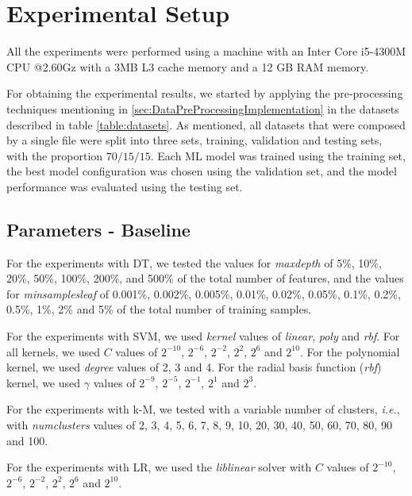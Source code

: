 \section{Experimental Setup}
\label{sec:ExperimentalSetup}

All the experiments were performed using a machine with an Inter Core i5-4300M CPU @2.60Gz with a 3MB L3 cache memory and a 12 GB RAM memory.

For obtaining the experimental results, we started by applying the pre-processing techniques mentioning in \ref{sec:DataPreProcessingImplementation} in the datasets described in table \ref{table:datasets}. As mentioned, all datasets that were composed by a single file were split into three sets, training, validation and testing sets, with the proportion $70/15/15$. Each \ac{ML} model was trained using the training set, the best model configuration was chosen using the validation set, and the model performance was evaluated using the testing set.

\subsection{Parameters - Baseline}

For the experiments with \ac{DT}, we tested the values for \textit{max\textunderscore depth} of 5\%, 10\%, 20\%, 50\%, 100\%, 200\%, and 500\% of the total number of features, and the values for \textit{min\textunderscore samples\textunderscore leaf} of 0.001\%, 0.002\%, 0.005\%, 0.01\%, 0.02\%, 0.05\%, 0.1\%, 0.2\%, 0.5\%, 1\%, 2\% and 5\% of the total number of training samples.

For the experiments with \ac{SVM}, we used \textit{kernel} values of \textit{linear}, \textit{poly} and \textit{rbf}. For all kernels, we used $C$ values of $2^{-10}$, $2^{-6}$, $2^{-2}$, $2^{2}$, $2^{6}$ and $2^{10}$. For the polynomial kernel, we used \textit{degree} values of 2, 3 and 4. For the radial basis function (\textit{rbf}) kernel, we used $\gamma$ values of $2^{-9}$, $2^{-5}$, $2^{-1}$, $2^{1}$ and $2^{3}$.

For the experiments with \ac{k-M}, we tested with a variable number of clusters, \textit{i.e.}, with \textit{num\textunderscore clusters} values of 2, 3, 4, 5, 6, 7, 8, 9, 10, 20, 30, 40, 50, 60, 70, 80, 90 and 100.

For the experiments with \ac{LR}, we used the \textit{liblinear} solver with $C$ values of $2^{-10}$, $2^{-6}$, $2^{-2}$, $2^{2}$, $2^{6}$ and $2^{10}$.


